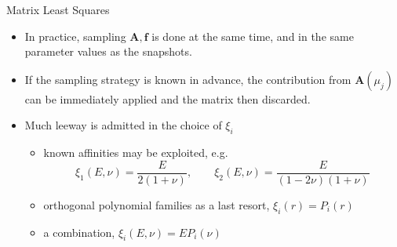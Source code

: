 \documentclass{sintefbeamer}
\begin{document}
\begin{frame}{Matrix Least Squares}
    \begin{itemize}
        \item In practice, sampling \(\mathbf A, \mathbf f\) is done at the same time, and in the same parameter values as the snapshots.
        \item If the sampling strategy is known in advance, the contribution from \(\mathbf A(\mu_j)\) can be immediately applied and the matrix then discarded.
        \item Much leeway is admitted in the choice of \(\xi_i\)
        \begin{itemize}
            \item known affinities may be exploited, e.g.~
            \[
                \xi_1(E,\nu) = \frac{E}{2(1+\nu)}, \qquad \xi_2(E,\nu) = \frac{E}{(1-2\nu)(1+\nu)}
            \]
            \item orthogonal polynomial families as a last resort, \( \xi_i(r) = P_i(r) \)
            \item a combination, \( \xi_i(E,\nu) = E P_i(\nu) \)
        \end{itemize}
    \end{itemize}
\end{frame}
\end{document}
